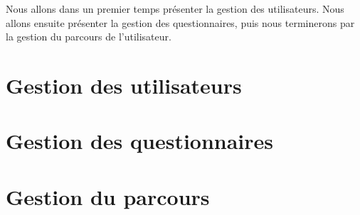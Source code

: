 \documentclass[12pt]{article}
\begin{document}
\vspace{1cm}

Nous allons dans un premier temps présenter la gestion des utilisateurs. Nous allons ensuite présenter la gestion des questionnaires, puis nous terminerons par la gestion du parcours de l'utilisateur.

\section{Gestion des utilisateurs}
\section{Gestion des questionnaires}
\section{Gestion du parcours}
\end{document}
